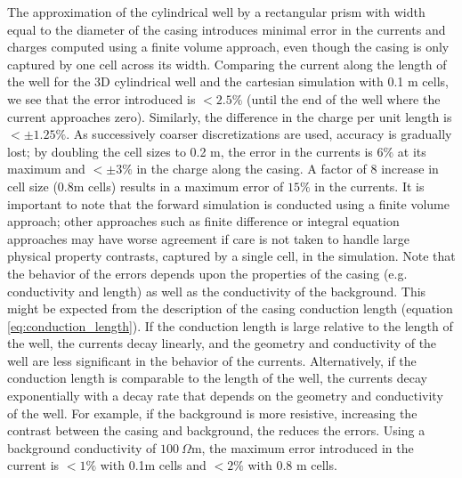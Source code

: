 \documentclass[extra,mreferee]{gji}
\begin{document}


The approximation of the cylindrical well by a rectangular prism with width equal to the diameter of the casing introduces minimal error in the currents and charges computed using a finite volume approach, even though the casing is only captured by one cell across its width. Comparing the current along the length of the well for the 3D cylindrical well and the cartesian simulation with 0.1 m cells, we see that the error introduced is $< 2.5\%$ (until the end of the well where the current approaches zero). Similarly, the difference in the charge per unit length is $< \pm 1.25\%$. As successively coarser discretizations are used, accuracy is gradually lost; by doubling the cell sizes to 0.2 m, the error in the currents is $6\%$ at its maximum and $< \pm 3\%$ in the charge along the casing. A factor of 8 increase in cell size (0.8m cells) results in a maximum error of $15\%$ in the currents. It is important to note that the forward simulation is conducted using a finite volume approach; other approaches such as finite difference or integral equation approaches may have worse agreement if care is not taken to handle large physical property contrasts, captured by a single cell, in the simulation. Note that the behavior of the errors depends upon the properties of the casing (e.g. conductivity and length) as well as the conductivity of the background. This might be expected from the description of the casing conduction length (equation \ref{eq:conduction_length}). If the conduction length is large relative to the length of the well, the currents decay linearly, and the geometry and conductivity of the well are less significant in the behavior of the currents. Alternatively, if the conduction length is comparable to the length of the well, the currents decay exponentially with a decay rate that depends on the geometry and conductivity of the well. For example, if the background is more resistive, increasing the contrast between the casing and background, the reduces the errors. Using a background conductivity of $100 ~ \Omega$m, the maximum error introduced in the current is $< 1\%$ with 0.1m cells and $< 2\%$ with 0.8 m cells.
\end{document}
